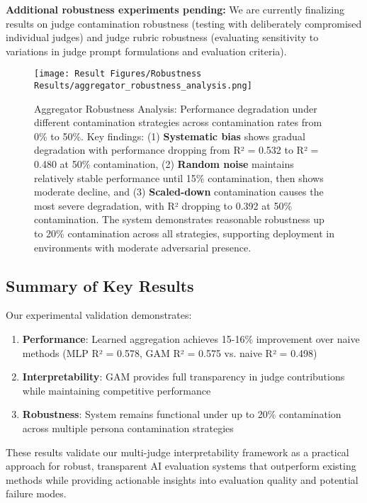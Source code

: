 \textbf{Additional robustness experiments pending:} We are currently finalizing results on judge contamination robustness (testing with deliberately compromised individual judges) and judge rubric robustness (evaluating sensitivity to variations in judge prompt formulations and evaluation criteria).

\begin{figure}[H]
    \centering
    \texttt{[image: Result Figures/Robustness Results/aggregator\_robustness\_analysis.png]}
    \caption{Aggregator Robustness Analysis: Performance degradation under different contamination strategies across contamination rates from 0\% to 50\%. Key findings: (1) \textbf{Systematic bias} shows gradual degradation with performance dropping from R² = 0.532 to R² = 0.480 at 50\% contamination, (2) \textbf{Random noise} maintains relatively stable performance until 15\% contamination, then shows moderate decline, and (3) \textbf{Scaled-down} contamination causes the most severe degradation, with R² dropping to 0.392 at 50\% contamination. The system demonstrates reasonable robustness up to 20\% contamination across all strategies, supporting deployment in environments with moderate adversarial presence.}
    \label{fig:robustness_analysis}
\end{figure}

\subsection{Summary of Key Results}

Our experimental validation demonstrates:

\begin{enumerate}
    \item \textbf{Performance}: Learned aggregation achieves 15-16\% improvement over naive methods (MLP R² = 0.578, GAM R² = 0.575 vs. naive R² = 0.498)
    \item \textbf{Interpretability}: GAM provides full transparency in judge contributions while maintaining competitive performance
    \item \textbf{Robustness}: System remains functional under up to 20\% contamination across multiple persona contamination strategies
\end{enumerate}

These results validate our multi-judge interpretability framework as a practical approach for robust, transparent AI evaluation systems that outperform existing methods while providing actionable insights into evaluation quality and potential failure modes.